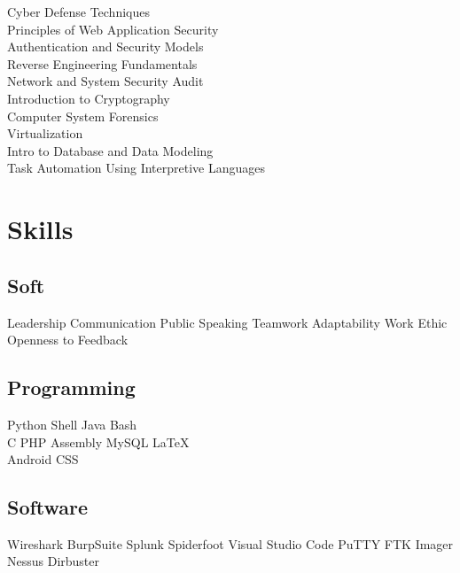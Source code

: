 \documentclass[]{deedy-resume-openfont}
\begin{document}
\begin{minipage}[t]{0.33\textwidth}
\textbullet{} Cyber Defense Techniques \\
\textbullet{} Principles of Web Application Security \\
\textbullet{} Authentication and Security Models \\
\textbullet{} Reverse Engineering Fundamentals \\
\textbullet{} Network and System Security Audit \\
\textbullet{} Introduction to Cryptography \\
\textbullet{} Computer System Forensics \\
\textbullet{} Virtualization \\
\textbullet{} Intro to Database and Data Modeling \\
\textbullet{} Task Automation Using Interpretive Languages \\
\sectionsep


\section{Skills}

\subsection{Soft}
Leadership \textbullet{} Communication \textbullet{} Public Speaking \textbullet{} Teamwork \textbullet{} Adaptability \textbullet{} Work Ethic \textbullet{} Openness to Feedback 
\sectionsep

\subsection{Programming}
Python \textbullet{} Shell \textbullet{} Java \textbullet{} Bash \\
C \textbullet{} PHP \textbullet{} Assembly \textbullet{} MySQL \textbullet{} \LaTeX\ \\
\textbullet{} Android \textbullet{} CSS
\sectionsep

\subsection{Software}
Wireshark \textbullet{} BurpSuite \textbullet{} Splunk \textbullet{} Spiderfoot \textbullet{} Visual Studio Code \textbullet{} PuTTY \textbullet{} FTK Imager \textbullet{} Nessus \textbullet{} Dirbuster
\sectionsep


\end{minipage}
\end{document}
